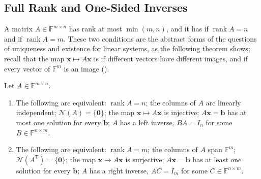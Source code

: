 \subsection{Full Rank and One-Sided Inverses}

A matrix $A\in\mathbb F^{m\times n}$ has rank at most $\min(m,n)$, and it has  if $\operatorname{rank}A=n$ and  if $\operatorname{rank}A=m$. These two conditions are the abstract forms of the questions of uniqueness and existence for linear systems, as the following theorem shows; recall that the map $\mathbf x\mapsto A\mathbf x$ is  if different vectors have different images, and  if every vector of $\mathbb F^m$ is an image ().

\begin{theorem}
\label{thm:full-rank}
Let $A\in\mathbb F^{m\times n}$.
\begin{enumerate}
\item The following are equivalent: $\operatorname{rank}A=n$; the columns of $A$ are linearly independent; $\mathcal N(A)=\{\mathbf 0\}$; the map $\mathbf x\mapsto A\mathbf x$ is injective; $A\mathbf x=\mathbf b$ has at most one solution for every $\mathbf b$; $A$ has a left inverse, $BA=I_n$ for some $B\in\mathbb F^{n\times m}$.
\item The following are equivalent: $\operatorname{rank}A=m$; the columns of $A$ span $\mathbb F^m$; $\mathcal N(A^{\mathsf T})=\{\mathbf 0\}$; the map $\mathbf x\mapsto A\mathbf x$ is surjective; $A\mathbf x=\mathbf b$ has at least one solution for every $\mathbf b$; $A$ has a right inverse, $AC=I_m$ for some $C\in\mathbb F^{n\times m}$.
\end{enumerate}
\end{theorem}

